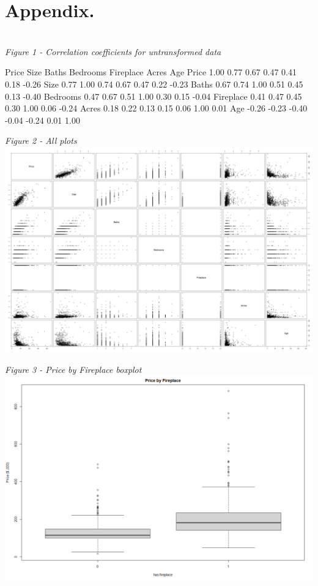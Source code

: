 \documentclass[10pt,A4,makeidx]{article}
\begin{document}
\pagebreak
\section*{Appendix.}
  \emph{\\Figure 1 - Correlation coefficients for untransformed data}
  \begin{Soutput}
              Price  Size Baths Bedrooms Fireplace Acres   Age
    Price      1.00  0.77  0.67     0.47      0.41  0.18 -0.26
    Size       0.77  1.00  0.74     0.67      0.47  0.22 -0.23
    Baths      0.67  0.74  1.00     0.51      0.45  0.13 -0.40
    Bedrooms   0.47  0.67  0.51     1.00      0.30  0.15 -0.04
    Fireplace  0.41  0.47  0.45     0.30      1.00  0.06 -0.24
    Acres      0.18  0.22  0.13     0.15      0.06  1.00  0.01
    Age       -0.26 -0.23 -0.40    -0.04     -0.24  0.01  1.00
  \end{Soutput}
  
  \emph{Figure 2 - All plots}\\
  \includegraphics[scale=2]{plot.png}
  
  \emph{Figure 3 - Price by Fireplace boxplot}\\
  \includegraphics[scale=0.4]{price-fireplace.png}
\end{document}
